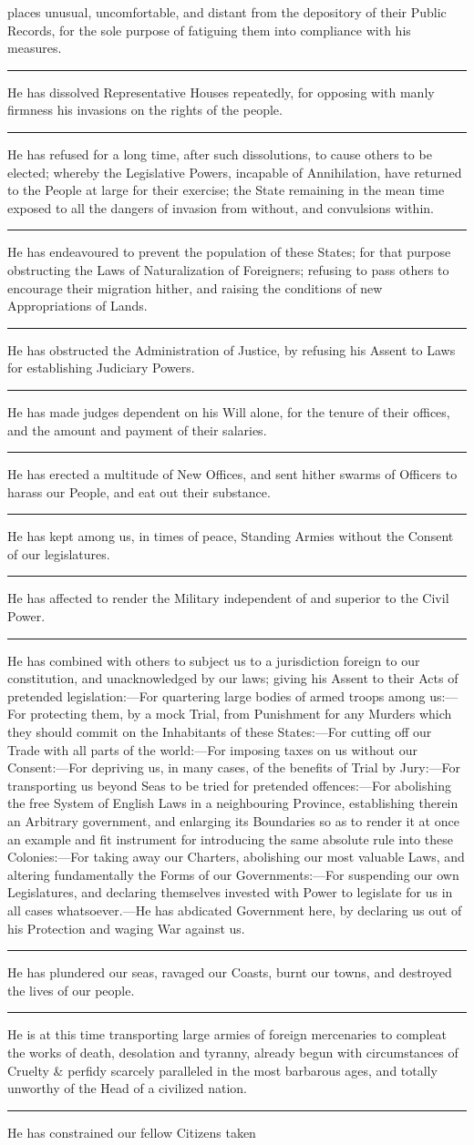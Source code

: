 \documentclass{article}
\begin{document}
places unusual, uncomfortable, and distant from the depository of their Public Records, for the sole purpose of fatiguing them into compliance with his measures.\rule[.5ex]{2em}{.2pt}He has dissolved Representative Houses repeatedly, for opposing with manly firmness his invasions on the rights of the people.\rule[.5ex]{2em}{.2pt}He has refused for a long time, after such dissolutions, to cause others to be elected; whereby the Legislative Powers, incapable of Annihilation, have returned to the People at large for their exercise; the State remaining in the mean time exposed to all the dangers of invasion from without, and convulsions within.\rule[.5ex]{2em}{.2pt}He has endeavoured to prevent the population of these States; for that purpose obstructing the Laws of Naturalization of Foreigners; refusing to pass others to encourage their migration hither, and raising the conditions of new Appropriations of Lands.\rule[.5ex]{2em}{.2pt}He has obstructed the Administration of Justice, by refusing his Assent to Laws for establishing Judiciary Powers.\rule[.5ex]{2em}{.2pt}He has made judges dependent on his Will alone, for the tenure of their offices, and the amount and payment of their salaries.\rule[.5ex]{2em}{.2pt}He has erected a multitude of New Offices, and sent hither swarms of Officers to harass our People, and eat out their substance.\rule[.5ex]{2em}{.2pt}He has kept among us, in times of peace, Standing Armies without the Consent of our legislatures.\rule[.5ex]{2em}{.2pt}He has affected to render the Military independent of and superior to the Civil Power.\rule[.5ex]{2em}{.2pt}He has combined with others to subject us to a jurisdiction foreign to our constitution, and unacknowledged by our laws; giving his Assent to their Acts of pretended legislation:---For quartering large bodies of armed troops among us:---For protecting them, by a mock Trial, from Punishment for any Murders which they should commit on the Inhabitants of these States:---For cutting off our Trade with all parts of the world:---For imposing taxes on us without our Consent:---For depriving us, in many cases, of the benefits of Trial by Jury:---For transporting us beyond Seas to be tried for pretended offences:---For abolishing the free System of English Laws in a neighbouring Province, establishing therein an Arbitrary government, and enlarging its Boundaries so as to render it at once an example and fit instrument for introducing the same absolute rule into these Colonies:---For taking away our Charters, abolishing our most valuable Laws, and altering fundamentally the Forms of our Governments:---For suspending our own Legislatures, and declaring themselves invested with Power to legislate for us in all cases whatsoever.---He has abdicated Government here, by declaring us out of his Protection and waging War against us.\rule[.5ex]{2em}{.2pt}He has plundered our seas, ravaged our Coasts, burnt our towns, and destroyed the lives of our people.\rule[.5ex]{2em}{.2pt}He is at this time transporting large armies of foreign mercenaries to compleat the works of death, desolation and tyranny, already begun with circumstances of Cruelty \& perfidy scarcely paralleled in the most barbarous ages, and totally unworthy of the Head of a civilized nation.\rule[.5ex]{2em}{.2pt}He has constrained our fellow Citizens taken 
\end{document}
